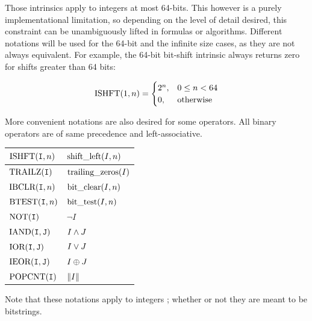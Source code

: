       
Those intrinsics apply to integers at most 64-bits. This however is a purely implementational limitation, so depending on the level of detail desired, this constraint can be unambiguously lifted in formulas or algorithms. Different notations will be used for the 64-bit and the infinite size cases, as they are not always equivalent.
For example, the 64-bit bit-shift intrinsic always returns zero for shifts greater than 64 bits:

$$ \ISHFT{1}{n} =
\begin{cases}
2^{n}, & 0 \le n < 64 \\
0, & \text{otherwise}
\end{cases}
$$

More convenient notations are also desired for some operators. All binary operators are of same precedence and left-associative.

\begin{table}[H]
	\begin{tabularx}{\textwidth}{X|X}
		\hline
		
		\hline
		\rule{0pt}{3ex}
		$\ISHFT{\bitI}{n}$ & $\text{shift\_left}(I,n)$  \\ 
		
		\hline
		\rule{0pt}{3ex}
		$\TRAILZ{\bitI}$ & $\text{trailing\_zeros}(I)$  \\ 
		
		\hline
		\rule{0pt}{3ex}
		$\IBCLR{\bitI}{n}$ & $\text{bit\_clear}(I,n)$  \\ 
		
		\hline
		\rule{0pt}{3ex}
		$\BTEST{\bitI}{n}$ & $\text{bit\_test}(I,n)$  \\ 
		
		\hline
		\rule{0pt}{3ex}
		$\NOT{\bitI}$ & $\neg I $  \\ 
		
		\hline
		\rule{0pt}{3ex}
		$\IAND{\bitI}{\bitJ}$ & $I \wedge J$ \\
		
		\hline
		\rule{0pt}{3ex}
		$\IOR{\bitI}{\bitJ}$ & $I \vee J$ \\
		
		\hline
		\rule{0pt}{3ex}
		$\IEOR{\bitI}{\bitJ}$ & $I \oplus J$ \\
		
		\hline
		\rule{0pt}{3ex}
		$\POPCNT{\bitI}$ & $\norm{I}$ \\
		\hline
	\end{tabularx}
\end{table}

Note that these notations apply to integers ; whether or not they are meant to be bitstrings.



